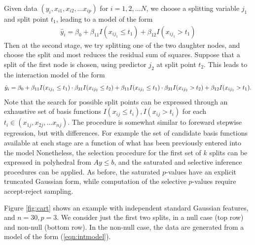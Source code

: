 \documentclass{article}
\begin{document}
Given data $(y_i, x_{i1}, x_{i2},\ldots x_{ip})$ for $i=1,2,\ldots N$,
we choose a splitting  variable $j_1$ and split point $t_1$, leading to a model of the form
\begin{eqnarray}
\hat y_i=\beta_0 +\beta_{11} I(x_{ij_1} \leq t_1) +\beta_{12} I(x_{ij_1} > t_1)
\end{eqnarray}
Then at the second stage, we try splitting one of the two daughter nodes, and choose the split and most reduces the residual sum of squares.
Suppose that a split of the first node is chosen, using predictor $j_2$ at split point $t_2$.  This leads to the interaction model of the form
\begin{eqnarray}
\hat y_i=\beta_0 +\beta_{11} I(x_{ij_1} \leq t_1) \cdot \beta_{31} I(x_{ij_2} \leq t_2)+   \beta_{11} I(x_{ij_1} \leq t_1) \cdot  \beta_{31} I(x_{ij_2} > t_2)  +\beta_{12} I(x_{ij_1} > t_1).\cr
\label{eqn:intmodel}
\end{eqnarray}
Note that the search for possible split points can be expressed through an exhaustive set of basis functions $I(x_{ij} \leq  t_i), I(x_{ij}  > t_i)$ for each $t_i \in (x_{1j}, x_{2j}, \ldots x_{nj})$.
The procedure is somewhat similar to foreward stepwise regression, but with differences.
For example the set of candidate basis functions available at each stage are a function of what has been  previously entered into the model
Nonetheless,  the selection procedure  for the first set of $k$ splits can be expressed in polyhedral from $Ay \leq b$, and the saturated and selective inference procedures can be applied.
As before, the saturated $p$-values have an explicit truncated Gaussian form, while computation of the selective $p$-values require accept-reject sampling.

Figure \ref{fig:cart} shows an example with independent standard Gaussian features, and $n=30, p=3$.
We 
consider just the first two splits, in a null case (top row) and non-null (bottom row).
In the non-null case,  the data are generated from a  model of the form (\ref{eqn:intmodel}).
\end{document}
